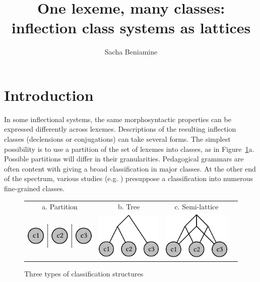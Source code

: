 \documentclass[output=paper]{langscibook}
\author{Sacha Beniamine\affiliation{Department of Linguistic and Cultural Evolution, Max Planck Institute EVA}}
\title{One lexeme, many classes: inflection class systems as lattices}
\begin{document}
\maketitle

    \section{Introduction}
    \label{Introduction:beniamine}
    
    In some inflectional systems, the same morphosyntactic properties can be expressed differently across lexemes. Descriptions of the resulting inflection classes (declensions or conjugations) can take several forms. The simplest possibility is to use a partition of the set of lexemes into classes, as in Figure~\ref{fig:beniamine:models}a. Possible partitions will differ in their granularities. Pedagogical grammars are often content with giving a broad classification in major classes. At the other end of the spectrum, various studies (e.g. \citealt{StumpFinkel2013}) presuppose a classification into numerous fine-grained classes. 
    
    \begin{figure}
        \begin{tabular}{cccc}
            a. Partition & b.  Tree & c. Semi-lattice \\
            \includegraphics{figures/partition.pdf}&
            \includegraphics{figures/tree-small.pdf}&
            \includegraphics{figures/lattice.pdf}\\
        \end{tabular}
        \caption{Three types of classification structures}
        \label{fig:beniamine:models}
    \end{figure}
    
\end{document}
